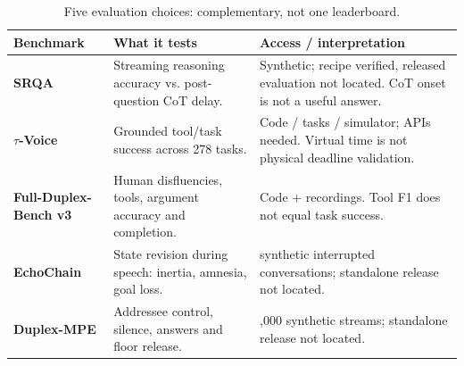 \begin{table}[H]
\centering\small
\setlength{\tabcolsep}{4pt}
\setlength{\tablewidth}{\dimexpr\linewidth-4\tabcolsep\relax}
\renewcommand{\arraystretch}{1.06}
\caption{Five evaluation choices: complementary, not one leaderboard.}
\label{tab:benchmarks}
\begin{tabular}{@{}>{\raggedright\arraybackslash}p{0.25\tablewidth}>{\raggedright\arraybackslash}p{0.34\tablewidth}>{\raggedright\arraybackslash}p{0.41\tablewidth}@{}}
\toprule
\textbf{Benchmark} & \textbf{What it tests} & \textbf{Access / interpretation} \\
\midrule
\textbf{SRQA} \citep{thinklisten} & Streaming reasoning accuracy vs. post-question CoT delay. & Synthetic; recipe verified, released evaluation not located. CoT onset is not a useful answer. \\
\addlinespace[2pt]
\textbf{$\tau$-Voice} \citep{tauvoice} & Grounded tool/task success across 278 tasks. & Code / tasks / simulator; APIs needed. Virtual time is not physical deadline validation. \\
\addlinespace[2pt]
\textbf{Full-Duplex-Bench v3} \citep{fdb3} & Human disfluencies, tools, argument accuracy and completion. & Code + recordings. Tool F1 does not equal task success. \\
\addlinespace[2pt]
\textbf{EchoChain} \citep{echochain} & State revision during speech: inertia, amnesia, goal loss. & 200 synthetic interrupted conversations; standalone release not located. \\
\addlinespace[2pt]
\textbf{Duplex-MPE} \citep{mpe} & Addressee control, silence, answers and floor release. & 4,000 synthetic streams; standalone release not located. \\
\bottomrule
\end{tabular}
\end{table}
